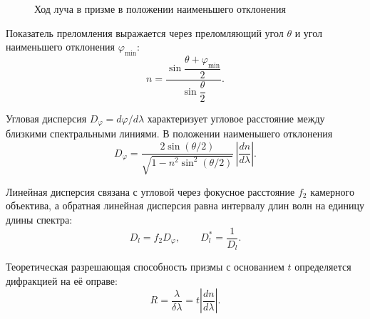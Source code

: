 \documentclass[14pt,a4paper]{extarticle}
\begin{document}
\begin{figure}[htbp]
\centering
{}
\caption{Ход луча в призме в положении наименьшего отклонения}
\label{fig:prism}
\end{figure}

Показатель преломления выражается через преломляющий угол $\theta$ и угол наименьшего отклонения $\varphi_{\min}$:
\begin{equation}
  n = \frac{\sin\dfrac{\theta + \varphi_{\min}}{2}}{\sin\dfrac{\theta}{2}}.
  \label{eq:n}
\end{equation}

Угловая дисперсия $D_\varphi = d\varphi/d\lambda$ характеризует угловое расстояние между близкими спектральными линиями. В положении наименьшего отклонения
\begin{equation}
  D_\varphi = \frac{2\sin(\theta/2)}{\sqrt{1 - n^2\sin^2(\theta/2)}}\,\left|\frac{dn}{d\lambda}\right|.
  \label{eq:Dphi}
\end{equation}

Линейная дисперсия связана с угловой через фокусное расстояние $f_2$ камерного объектива, а обратная линейная дисперсия равна интервалу длин волн на единицу длины спектра:
\begin{equation}
  D_l = f_2 D_\varphi, \qquad D_l^{*} = \frac{1}{D_l}.
  \label{eq:Dl}
\end{equation}

Теоретическая разрешающая способность призмы с основанием $t$ определяется дифракцией на её оправе:
\begin{equation}
  R = \frac{\lambda}{\delta\lambda} = t\left|\frac{dn}{d\lambda}\right|.
  \label{eq:R}
\end{equation}
\end{document}
